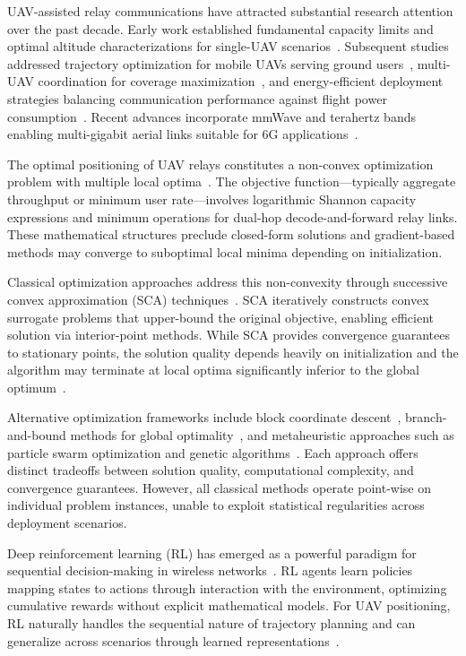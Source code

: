 \documentclass[journal]{IEEEtran}
\begin{document}
UAV-assisted relay communications have attracted substantial research attention over the past decade. Early work established fundamental capacity limits and optimal altitude characterizations for single-UAV scenarios~\cite{alhourani2014}. Subsequent studies addressed trajectory optimization for mobile UAVs serving ground users~\cite{wu2018}, multi-UAV coordination for coverage maximization~\cite{zhao2019}, and energy-efficient deployment strategies balancing communication performance against flight power consumption~\cite{zeng2019}. Recent advances incorporate mmWave and terahertz bands enabling multi-gigabit aerial links suitable for 6G applications~\cite{xiao2020}.

The optimal positioning of UAV relays constitutes a non-convex optimization problem with multiple local optima~\cite{wu2018}. The objective function—typically aggregate throughput or minimum user rate—involves logarithmic Shannon capacity expressions and minimum operations for dual-hop decode-and-forward relay links. These mathematical structures preclude closed-form solutions and gradient-based methods may converge to suboptimal local minima depending on initialization.

Classical optimization approaches address this non-convexity through successive convex approximation (SCA) techniques~\cite{wu2018, sun2017}. SCA iteratively constructs convex surrogate problems that upper-bound the original objective, enabling efficient solution via interior-point methods. While SCA provides convergence guarantees to stationary points, the solution quality depends heavily on initialization and the algorithm may terminate at local optima significantly inferior to the global optimum~\cite{chen2023}.

Alternative optimization frameworks include block coordinate descent~\cite{zeng2019}, branch-and-bound methods for global optimality~\cite{wu2020}, and metaheuristic approaches such as particle swarm optimization and genetic algorithms~\cite{shakhatreh2019}. Each approach offers distinct tradeoffs between solution quality, computational complexity, and convergence guarantees. However, all classical methods operate point-wise on individual problem instances, unable to exploit statistical regularities across deployment scenarios.

Deep reinforcement learning (RL) has emerged as a powerful paradigm for sequential decision-making in wireless networks~\cite{luong2019}. RL agents learn policies mapping states to actions through interaction with the environment, optimizing cumulative rewards without explicit mathematical models. For UAV positioning, RL naturally handles the sequential nature of trajectory planning and can generalize across scenarios through learned representations~\cite{liu2019}.
\end{document}
